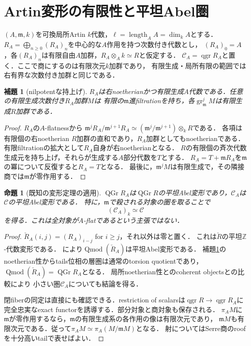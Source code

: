 \documentclass[11pt,a4paper]{ltjsarticle}
\newtheorem{proposition}[theorem]{命題}
\newtheorem{lemma}[theorem]{補題}
\theoremstyle{definition}
\newcommand{\CC}{\mathcal C}
\newcommand{\mm}{\mathfrak m}
\newcommand{\qgr}{\operatorname{qgr}}
\newcommand{\QGr}{\operatorname{QGr}}
\newcommand{\gr}{\operatorname{gr}}
\newcommand{\len}{\operatorname{length}}
\begin{document}
\section{Artin変形の有限性と平坦Abel圏}\label{sec:abelian}
$(A,\mm,k)$を可換局所Artin $k$代数，$\ell=\len_A A=\dim_k A$とする．
$R_A=\bigoplus_{n\geq0}(R_A)_n$を中心的な$A$作用を持つ次数付き代数とし，
$(R_A)_0=A$，各$(R_A)_n$は有限自由$A$加群，$R_A\otimes_A k\simeq R$と仮定する．
$\CC_A=\qgr R_A$と置く．ここで商にするのは有限次元$k$加群であり，
有限生成・局所有限の範囲では右有界な次数付き加群と同じである．

\begin{lemma}[nilpotentな持上げ]\label{lem:noetherian-lift}
$R_A$は右noetherianかつ有限生成$A$代数である．任意の有限生成次数付き$R_A$加群$M$は
有限の$\mm$進filtrationを持ち，各$\gr_{\mm}^jM$は有限生成$R$加群である．
\end{lemma}
\begin{proof}
$R_A$の$A$-flatnessから
$\mm^jR_A/\mm^{j+1}R_A\simeq(\mm^j/\mm^{j+1})\otimes_kR$である．
各項は有限個の右noetherian $R$加群の直和であり，$R_A$加群としてもnoetherianである．
有限filtrationの拡大として$R_A$自身が右noetherianとなる．
$R$の有限個の斉次代数生成元を持ち上げ，それらが生成する$A$部分代数を$T$とする．
$R_A=T+\mm R_A$を$\mm$の冪について反復すると$R_A=T$となる．
最後に，$\mm^jM$は有限生成で，その隣接商では$\mm$が零作用する．
\end{proof}

\begin{proposition}[既知の変形定理の適用]\label{prop:abelian-lift}
$\QGr R_A$は$\QGr R$の平坦Abel変形であり，$\CC_A$は$\CC$の平坦Abel変形である．
特に，$\mm$で殺される対象の圏を取ることで
\begin{equation}\label{eq:closed-fiber}
 (\CC_A)_k\simeq\CC
\end{equation}
を得る．これは全対象が$A$-flatであるという主張ではない．
\end{proposition}
\begin{proof}
$\check R_A(i,j)=(R_A)_{i-j}$ for $i\geq j$，それ以外は零と置く．
これは$\check R$の平坦$\mathbb Z$-代数変形である．
\cite[Proposition 4.4]{DDL}により$\operatorname{Qmod}(\check R_A)$は平坦Abel変形である．
補題\ref{lem:noetherian-lift}のnoetherian性からtails位相の層圏は通常のtorsion quotientであり，
$\operatorname{Qmod}(\check R_A)=\QGr R_A$となる．
局所noetherian性と\cite[\S8.5, Theorem 8.8]{LVdB}のcoherent objectsとの比較により
小さい圏$\CC_A$についても結論を得る．

閉fiberの同定は直接にも確認できる．restriction of scalarsは$\qgr R\to\qgr R_A$に
完全忠実なexact functorを誘導する．部分対象と商対象も保存される．
$\pi_A M$に$\mm$が零作用するなら，$\mm$の有限生成系の各作用の像は有限次元であり，
$\mm M$も有限次元である．従って$\pi_A M\simeq\pi_A(M/\mm M)$となる．
射についてはSerre商のroofを十分高いtailで表せばよい．
\end{proof}
\end{document}
